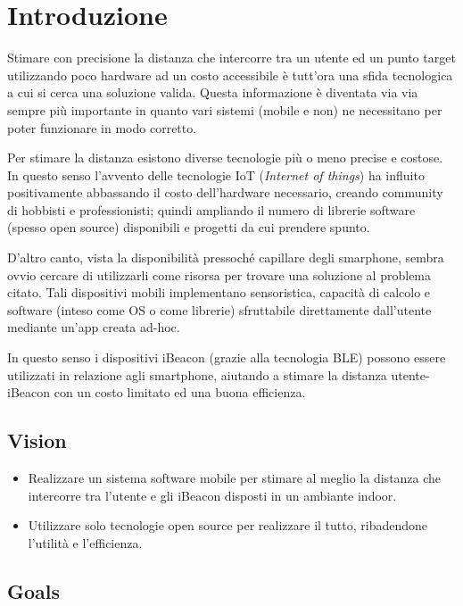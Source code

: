 \chapter{Introduzione}
	Stimare con precisione la distanza che intercorre tra un utente ed un punto target utilizzando poco hardware ad un costo accessibile è tutt'ora una sfida tecnologica a cui si cerca una soluzione valida. Questa informazione è diventata via via sempre più importante in quanto vari sistemi (mobile e non) ne necessitano per poter funzionare in modo corretto. 
	
	Per stimare la distanza esistono diverse tecnologie più o meno precise e costose. In questo senso l'avvento delle tecnologie IoT (\textit{Internet of things}) ha influito positivamente abbassando il costo dell'hardware necessario, creando community di hobbisti e professionisti; quindi ampliando il numero di librerie software (spesso open source) disponibili e progetti da cui prendere spunto.
	
	D'altro canto, vista la disponibilità pressoché capillare degli smarphone, sembra ovvio cercare di utilizzarli come risorsa per trovare una soluzione al problema citato. Tali dispositivi mobili implementano sensoristica, capacità di calcolo e software (inteso come OS o come librerie) sfruttabile direttamente dall'utente mediante un'app creata ad-hoc.
	
	In questo senso i dispositivi iBeacon (grazie alla tecnologia BLE) possono essere utilizzati in relazione agli smartphone, aiutando a stimare la distanza utente-iBeacon con un costo limitato ed una buona efficienza.
	
\section{Vision}

\begin{itemize}
	\item Realizzare un sistema software mobile per stimare al meglio la distanza che intercorre tra l'utente e gli iBeacon disposti in un ambiante indoor.
	
	\item Utilizzare solo tecnologie open source per realizzare il tutto, ribadendone l'utilità e l'efficienza.
\end{itemize}

\section{Goals}
